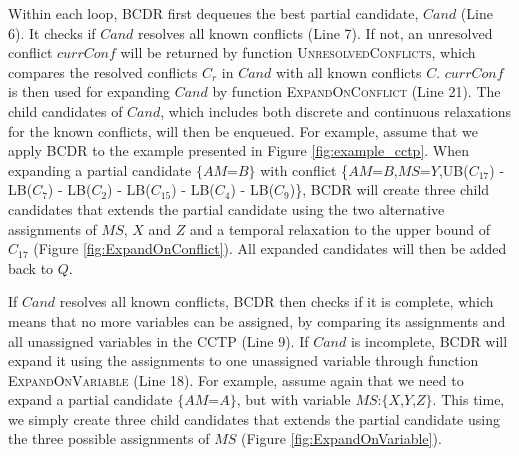 \documentclass[jair,twoside,11pt,theapa]{article}
\begin{document}
Within each loop, BCDR first dequeues the best partial candidate, $\mathit{Cand}$ (Line
6). It checks if $\mathit{Cand}$ resolves all known conflicts (Line 7). If not, an
unresolved conflict $\mathit{currConf}$ will be returned by function
\textsc{UnresolvedConflicts}, which compares the resolved conflicts $C_r$ in
$\mathit{Cand}$ with all known conflicts $C$. $\mathit{currConf}$ is then used for expanding $\mathit{Cand}$
by function \textsc{ExpandOnConflict} (Line 21). The child candidates of $\mathit{Cand}$,
which includes both discrete and continuous relaxations for the known conflicts,
will then be enqueued. For example, assume that we apply BCDR to the example
presented in Figure \ref{fig:example_cctp}. When expanding
a partial candidate $\{AM$=$B\}$ with conflict
\{$AM$=$B$,$MS$=$Y$,\textsc{UB}($C_{17}$) - \textsc{LB}($C_{7}$) -
\textsc{LB}($C_{2}$) - \textsc{LB}($C_{15}$) - \textsc{LB}($C_{4}$) -
\textsc{LB}($C_{9}$)\}, BCDR will create three child candidates that extends
the partial candidate using the two alternative assignments of $MS$, $X$ and $Z$
and a temporal relaxation to the upper bound of $C_{17}$ (Figure
\ref{fig:ExpandOnConflict}). All expanded candidates
will then be added back to $Q$.


If $\mathit{Cand}$ resolves all known conflicts, BCDR then checks if it is complete,
which means that no more variables can be assigned, by comparing its assignments
and all unassigned variables in the CCTP (Line 9). If $\mathit{Cand}$ is incomplete, BCDR
will expand it using the assignments to one unassigned variable through function
\textsc{ExpandOnVariable} (Line 18). For example, assume again that we need to expand
a partial candidate $\{AM$=$A\}$, but with variable
$MS$:$\{X$,$Y$,$Z\}$. This time, we simply create three child candidates that extends
the partial candidate using the three possible assignments of $MS$ (Figure
\ref{fig:ExpandOnVariable}).
\end{document}
